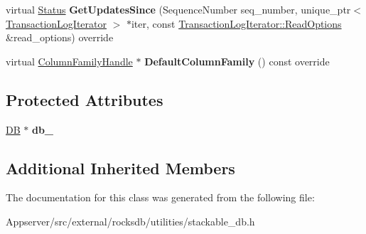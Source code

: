 \begin{DoxyCompactItemize}
\item 
virtual \hyperlink{classrocksdb_1_1Status}{Status} {\bfseries Get\+Updates\+Since} (Sequence\+Number seq\+\_\+number, unique\+\_\+ptr$<$ \hyperlink{classrocksdb_1_1TransactionLogIterator}{Transaction\+Log\+Iterator} $>$ $\ast$iter, const \hyperlink{structrocksdb_1_1TransactionLogIterator_1_1ReadOptions}{Transaction\+Log\+Iterator\+::\+Read\+Options} \&read\+\_\+options) override\hypertarget{classrocksdb_1_1StackableDB_afa9b2193d2824492479b9622d63d9831}{}\label{classrocksdb_1_1StackableDB_afa9b2193d2824492479b9622d63d9831}

\item 
virtual \hyperlink{classrocksdb_1_1ColumnFamilyHandle}{Column\+Family\+Handle} $\ast$ {\bfseries Default\+Column\+Family} () const override\hypertarget{classrocksdb_1_1StackableDB_a9c8905c4cf03af97e656d557cef141be}{}\label{classrocksdb_1_1StackableDB_a9c8905c4cf03af97e656d557cef141be}

\end{DoxyCompactItemize}
\subsection*{Protected Attributes}
\begin{DoxyCompactItemize}
\item 
\hyperlink{classrocksdb_1_1DB}{DB} $\ast$ {\bfseries db\+\_\+}\hypertarget{classrocksdb_1_1StackableDB_ac8ef2d82d713dab7b05fbc3cac4cb97b}{}\label{classrocksdb_1_1StackableDB_ac8ef2d82d713dab7b05fbc3cac4cb97b}

\end{DoxyCompactItemize}
\subsection*{Additional Inherited Members}


The documentation for this class was generated from the following file\+:\begin{DoxyCompactItemize}
\item 
Appserver/src/external/rocksdb/utilities/stackable\+\_\+db.\+h\end{DoxyCompactItemize}
